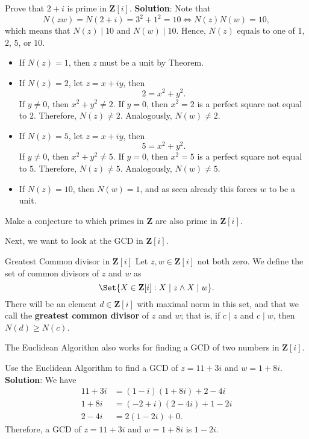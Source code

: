 \begin{Exercise}{}{}
    Prove that $ 2+i $ is prime in $ \mathbf{Z}[i] $.
    \tcblower{}
    \textbf{Solution}: Note that
    \[ N(zw)=N(2+i)=3^2+1^2=10\iff N(z)N(w)=10, \]
    which means that $ N(z)\mid 10 $ and $ N(w)\mid 10 $. Hence, $ N(z) $ equals to one of $ 1 $, $ 2 $, $ 5 $, or $ 10 $.
    \begin{itemize}
        \item If $ N(z)=1 $, then $ z $ must be a unit by Theorem.
        \item If $ N(z)=2 $, let $ z=x+iy $, then
              \[ 2=x^2+y^2. \]
              If $ y\ne 0 $, then $ x^2+y^2\ne 2 $. If $ y=0 $, then $ x^2=2 $
              is a perfect square not equal to $ 2 $. Therefore, $ N(z)\ne 2 $. Analogously, $ N(w)\ne 2 $.
        \item If $ N(z)=5 $, let $ z=x+iy $, then
              \[ 5=x^2+y^2. \]
              If $ y\ne 0 $, then $ x^2+y^2\ne 5 $. If $ y=0 $, then $ x^2=5 $
              is a perfect square not equal to $ 5 $. Therefore, $ N(z)\ne 5 $. Analogously, $ N(w)\ne 5 $.
        \item If $ N(z)=10 $, then $ N(w)=1 $, and as seen already this forces $ w $ to be a unit.
    \end{itemize}
\end{Exercise}
\begin{Exercise}{}{}
    Make a conjecture to which primes in $ \mathbf{Z} $ are also prime in $ \mathbf{Z}[i] $.
\end{Exercise}
Next, we want to look at the GCD in $ \mathbf{Z}[i] $.
\begin{Definition}{Greatest Common divisor in $ \mathbf{Z}[i] $}{}
    Let $ z,w\in\mathbf{Z}[i] $ not both zero. We define the set of common divisors of $ z $ and $ w $ as
    \[ \Set{X\in\mathbf{Z}[i]\given X\mid z\land X\mid w}. \]
    There will be an element $ d\in\mathbf{Z}[i] $ with maximal norm in this set, and that we call the
    \textbf{greatest common divisor} of $z$ and $w$; that is, if $ c\mid z $ and $ c\mid w $, then $N (d) \ge N (c)$.
\end{Definition}
The Euclidean Algorithm also works for finding a GCD of two numbers in $ \mathbf{Z}[i] $.
\begin{Example}{}{}
    Use the Euclidean Algorithm to find a GCD of $ z=11+3i $ and $ w=1+8i $.
    \tcblower{}
    \textbf{Solution}: We have
    \begin{align*}
        11+3i & =(1-i)(1+8i)+2-4i  \\
        1+8i  & =(-2+i)(2-4i)+1-2i \\
        2-4i  & =2(1-2i)+0.
    \end{align*}
    Therefore, a GCD of $ z=11+3i $ and $ w=1+8i $ is $ 1-2i $.
\end{Example}

